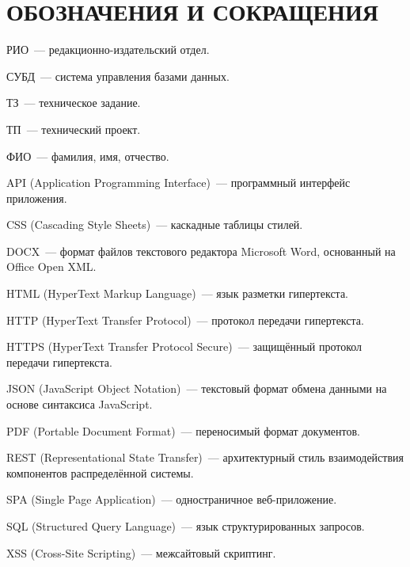 \section*{ОБОЗНАЧЕНИЯ И СОКРАЩЕНИЯ}

РИО~--- редакционно-издательский отдел.

СУБД~--- система управления базами данных.

ТЗ~--- техническое задание.

ТП~--- технический проект.

ФИО~--- фамилия, имя, отчество.

API (Application Programming Interface)~--- программный интерфейс приложения.

CSS (Cascading Style Sheets)~--- каскадные таблицы стилей.

DOCX~--- формат файлов текстового редактора Microsoft Word, основанный на Office Open XML.

HTML (HyperText Markup Language)~--- язык разметки гипертекста.

HTTP (HyperText Transfer Protocol)~--- протокол передачи гипертекста.

HTTPS (HyperText Transfer Protocol Secure)~--- защищённый протокол передачи гипертекста.

JSON (JavaScript Object Notation)~--- текстовый формат обмена данными на основе синтаксиса JavaScript.

PDF (Portable Document Format)~--- переносимый формат документов.

REST (Representational State Transfer)~--- архитектурный стиль взаимодействия компонентов распределённой системы.

SPA (Single Page Application)~--- одностраничное веб-приложение.

SQL (Structured Query Language)~--- язык структурированных запросов.

XSS (Cross-Site Scripting)~--- межсайтовый скриптинг.
